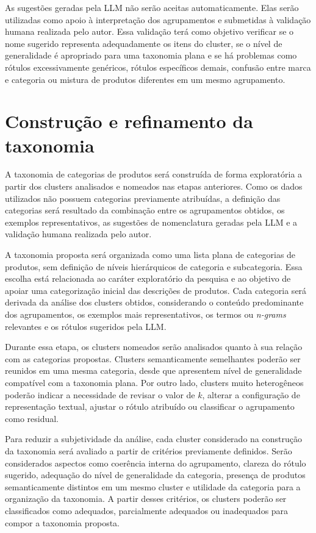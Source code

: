 \documentclass[english,brazilian]{UNISINOSmonografia}
\begin{document}
As sugestões geradas pela LLM não serão aceitas automaticamente. Elas serão utilizadas como apoio à interpretação dos agrupamentos e submetidas à validação humana realizada pelo autor. Essa validação terá como objetivo verificar se o nome sugerido representa adequadamente os itens do cluster, se o nível de generalidade é apropriado para uma taxonomia plana e se há problemas como rótulos excessivamente genéricos, rótulos específicos demais, confusão entre marca e categoria ou mistura de produtos diferentes em um mesmo agrupamento.



\section{Construção e refinamento da taxonomia}

A taxonomia de categorias de produtos será construída de forma exploratória a partir dos clusters analisados e nomeados nas etapas anteriores. Como os dados utilizados não possuem categorias previamente atribuídas, a definição das categorias será resultado da combinação entre os agrupamentos obtidos, os exemplos representativos, as sugestões de nomenclatura geradas pela LLM e a validação humana realizada pelo autor.

A taxonomia proposta será organizada como uma lista plana de categorias de produtos, sem definição de níveis hierárquicos de categoria e subcategoria. Essa escolha está relacionada ao caráter exploratório da pesquisa e ao objetivo de apoiar uma categorização inicial das descrições de produtos. Cada categoria será derivada da análise dos clusters obtidos, considerando o conteúdo predominante dos agrupamentos, os exemplos mais representativos, os termos ou \textit{n-grams} relevantes e os rótulos sugeridos pela LLM.

Durante essa etapa, os clusters nomeados serão analisados quanto à sua relação com as categorias propostas. Clusters semanticamente semelhantes poderão ser reunidos em uma mesma categoria, desde que apresentem nível de generalidade compatível com a taxonomia plana. Por outro lado, clusters muito heterogêneos poderão indicar a necessidade de revisar o valor de $k$, alterar a configuração de representação textual, ajustar o rótulo atribuído ou classificar o agrupamento como residual.

Para reduzir a subjetividade da análise, cada cluster considerado na construção da taxonomia será avaliado a partir de critérios previamente definidos. Serão considerados aspectos como coerência interna do agrupamento, clareza do rótulo sugerido, adequação do nível de generalidade da categoria, presença de produtos semanticamente distintos em um mesmo cluster e utilidade da categoria para a organização da taxonomia. A partir desses critérios, os clusters poderão ser classificados como adequados, parcialmente adequados ou inadequados para compor a taxonomia proposta.
\end{document}

